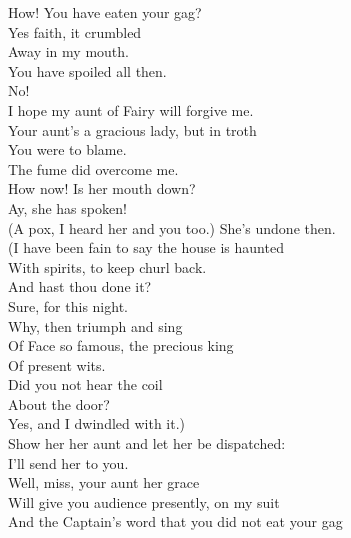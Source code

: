 \documentclass[a4paper,oneside,12pt]{memoir}
\begin{document}
\begin{drama*}
\subtlespeaks How! You have eaten your gag?\\
\dapperspeaks {} Yes faith, it crumbled\\
Away in my mouth.\\
\subtlespeaks {} You have spoiled all then.\\
\dapperspeaks {} No!\\
I hope my aunt of Fairy will forgive me.\\
\subtlespeaks Your aunt's a gracious lady, but in troth\\
You were to blame.\\
\dapperspeaks {} The fume did overcome me.\\
\facespeaks How now! Is her mouth down?\\
\subtlespeaks {} Ay, she has spoken!\\
\facespeaks (A pox, I heard her and you too.) She's undone then.\\
(I have been fain to say the house is haunted\\
With spirits, to keep churl back.\\
\subtlespeaks {} And hast thou done it?\\
\facespeaks Sure, for this night.\\
\subtlespeaks {} Why, then triumph and sing\\
Of Face so famous, the precious king\\
Of present wits.\\
\facespeaks {} Did you not hear the coil\\
About the door?\\
\subtlespeaks {} Yes, and I dwindled with it.)\\
\facespeaks Show her her aunt and let her be dispatched:\\
I'll send her to you.\\
\subtlespeaks {} Well, miss, your aunt her grace\\
Will give you audience presently, on my suit\\
And the Captain's word that you did not eat your gag\\

\end{drama*}
\end{document}
